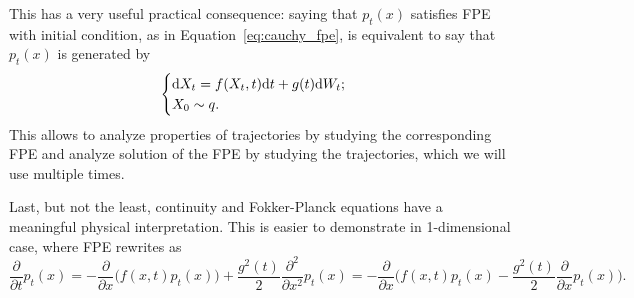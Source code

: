 This has a very useful practical consequence: saying that $p_t(x)$ satisfies FPE with initial condition, as in Equation~\ref{eq:cauchy_fpe}, is equivalent to say that $p_t(x)$ is generated by
\begin{equation}\label{eq:cauchy_sde}
    \begin{cases}
        \mathrm{d} X_t = f(X_t, t)\mathrm{d} t + g(t) \mathrm{d} W_t;\\
        X_0 \sim q.
    \end{cases}
\end{equation}
This allows to analyze properties of trajectories by studying the corresponding FPE and analyze solution of the FPE by studying the trajectories, which we will use multiple times.

Last, but not the least, continuity and Fokker-Planck equations have a meaningful physical interpretation. This is easier to demonstrate in 1-dimensional case, where FPE rewrites as
\[
    \frac{\partial}{\partial t} p_t(x) = - \frac{\partial}{\partial x} \Big(f(x, t)p_t(x)\Big) + \frac{g^2(t)}{2}\frac{\partial^2}{\partial x^2}p_t(x) = -\frac{\partial}{\partial x} \Big(f(x, t)p_t(x) - \frac{g^2(t)}{2} \frac{\partial}{\partial x} p_t(x)\Big).
\]



